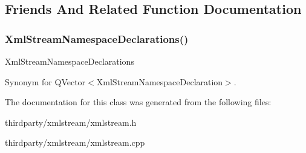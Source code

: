 \subsection{Friends And Related Function Documentation}
\mbox{\label{class_xml_stream_namespace_declaration_a79ff04192c4a4b6ac757799375b0ce50}} 
\subsubsection{\texorpdfstring{Xml\+Stream\+Namespace\+Declarations()}{XmlStreamNamespaceDeclarations()}}
{\footnotesize\ttfamily Xml\+Stream\+Namespace\+Declarations\hspace{0.3cm}{\ttfamily [related]}}

Synonym for Q\+Vector$<$\+Xml\+Stream\+Namespace\+Declaration$>$. 

The documentation for this class was generated from the following files\+:\begin{DoxyCompactItemize}
\item 
thirdparty/xmlstream/xmlstream.\+h\item 
thirdparty/xmlstream/xmlstream.\+cpp\end{DoxyCompactItemize}
